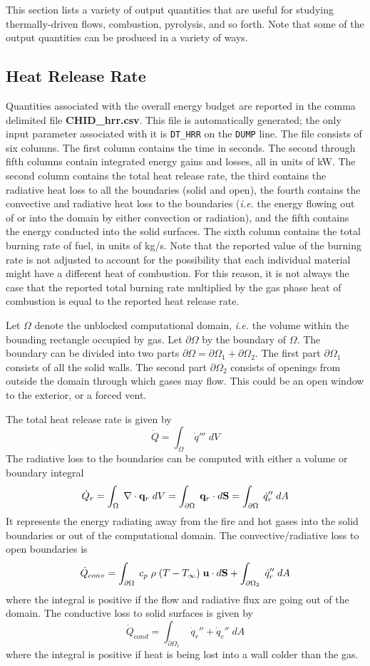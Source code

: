 \documentclass[11pt]{book}
\newcommand{\ct}{\tt\small}
\newcommand{\dS}{{d\bf S}}
\newcommand{\dA}{{dA}}
\newcommand{\bq}{{\bf q}}
\newcommand{\bu}{{\bf u}}
\newcommand{\dq}{\dot{q}}
\newcommand{\be}{\begin{equation}}
\newcommand{\ee}{\end{equation}}
\begin{document}
This section lists a variety of output quantities that are useful for studying thermally-driven flows, combustion, pyrolysis, and so forth. Note that some
of the output quantities can be produced in a variety of ways.


\subsection{Heat Release Rate}
\label{info:HRR}

Quantities associated with the overall energy budget are reported in
the comma delimited file {\bf CHID\_hrr.csv}.  This file is
automatically generated; the only input parameter associated with it
is {\ct DT\_HRR} on the {\ct DUMP} line. The file consists of six
columns.  The first column contains the time in seconds. The second
through fifth columns contain integrated energy gains and losses, all
in units of kW. The second column contains the total heat release
rate, the third contains the radiative heat loss to all the boundaries
(solid and open), the fourth contains the convective and radiative
heat loss to the boundaries ({\em i.e.} the energy flowing out of or
into the domain by either convection or radiation), and the fifth contains the energy conducted into the
solid surfaces.  The sixth column contains the total burning rate of
fuel, in units of kg/s. Note that the reported value of the burning rate is not adjusted to account for the possibility that each individual
material might have a different heat of combustion. For this reason, it is not always the case that the reported total
burning rate multiplied by the gas phase heat of combustion is equal to the reported heat release rate.

Let $\Omega$ denote the unblocked computational domain, {\em i.e.} the
volume within the bounding rectangle occupied by gas. Let $\partial
\Omega$ by the boundary of $\Omega$. The boundary can be divided into
two parts $\partial \Omega = \partial \Omega_1 + \partial
\Omega_2$. The first part $\partial \Omega_1$ consists of all the
solid walls. The second part $\partial \Omega_2$ consists of openings
from outside the domain through which gases may flow. This could be an
open window to the exterior, or a forced vent.

The total heat release rate is given by
\be \dot{Q} = \int_\Omega \; \dq''' \; dV \ee
The radiative loss to the
boundaries can be computed with either a volume or boundary integral
\be \dot{Q}_r = \int_\Omega \; \nabla \cdot \bq_r \; dV =
\int_{\partial \Omega} \; \bq_r \cdot \dS = \int_{\partial \Omega} \; \dq_r'' \; \dA \ee
It represents the energy radiating away from the fire and hot gases into
the solid boundaries or out of the computational domain. The convective/radiative
loss to open boundaries is
\be \dot{Q}_{conv} =  \int_{\partial \Omega} \; c_p \; \rho \; (T-T_\infty) \; \bu \cdot \dS
   + \int_{\partial \Omega_2} \; \dq_r'' \; \dA  \ee
where the integral is positive if the flow and radiative flux are going out of the domain.
The conductive loss to solid surfaces is given by
\be \dot{Q}_{cond} = \int_{\partial \Omega_1} \; \dq_r'' + \dq_c'' \; \dA  \ee
where the integral is positive if heat is being lost into a wall colder
than the gas.
\end{document}
